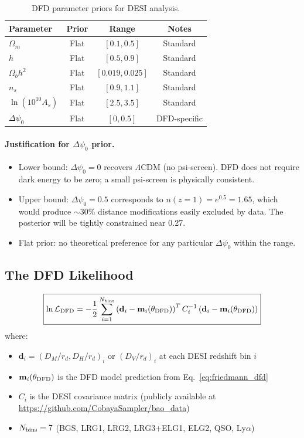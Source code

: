 \documentclass[11pt,a4paper]{article}
\newcommand{\LCDM}{$\Lambda$CDM}
\begin{document}
\begin{table}[H]
\centering
\caption{DFD parameter priors for DESI analysis.}
\begin{tabular}{lccc}
\toprule
Parameter & Prior & Range & Notes \\
\midrule
$\Omega_m$ & Flat & $[0.1, 0.5]$ & Standard \\
$h$ & Flat & $[0.5, 0.9]$ & Standard \\
$\Omega_b h^2$ & Flat & $[0.019, 0.025]$ & Standard \\
$n_s$ & Flat & $[0.9, 1.1]$ & Standard \\
$\ln(10^{10} A_s)$ & Flat & $[2.5, 3.5]$ & Standard \\
$\Delta\psi_0$ & Flat & $[0, 0.5]$ & DFD-specific \\
\bottomrule
\end{tabular}
\end{table}

\paragraph{Justification for $\Delta\psi_0$ prior.}
\begin{itemize}[nosep]
\item Lower bound: $\Delta\psi_0 = 0$ recovers \LCDM{} (no psi-screen).
  DFD does not require dark energy to be zero; a small psi-screen is
  physically consistent.
\item Upper bound: $\Delta\psi_0 = 0.5$ corresponds to $n(z=1) = e^{0.5}
  = 1.65$, which would produce $\sim$30\% distance modifications easily
  excluded by data. The posterior will be tightly constrained near 0.27.
\item Flat prior: no theoretical preference for any particular $\Delta\psi_0$
  within the range.
\end{itemize}

\subsection{The DFD Likelihood}

\begin{equation}
\boxed{
\ln\mathcal{L}_{\rm DFD} = -\frac{1}{2}\sum_{i=1}^{N_{\rm bins}}
\left(\mathbf{d}_i - \mathbf{m}_i(\theta_{\rm DFD})\right)^T
C_i^{-1}
\left(\mathbf{d}_i - \mathbf{m}_i(\theta_{\rm DFD})\right)
}
\label{eq:likelihood}
\end{equation}
where:
\begin{itemize}[nosep]
\item $\mathbf{d}_i = (D_M/r_d, D_H/r_d)_i$ or $(D_V/r_d)_i$ at
  each DESI redshift bin $i$
\item $\mathbf{m}_i(\theta_{\rm DFD})$ is the DFD model prediction
  from Eq.~\eqref{eq:friedmann_dfd}
\item $C_i$ is the DESI covariance matrix (publicly available at
  \url{https://github.com/CobayaSampler/bao_data})
\item $N_{\rm bins} = 7$ (BGS, LRG1, LRG2, LRG3+ELG1, ELG2, QSO,
  Ly$\alpha$)
\end{itemize}
\end{document}
